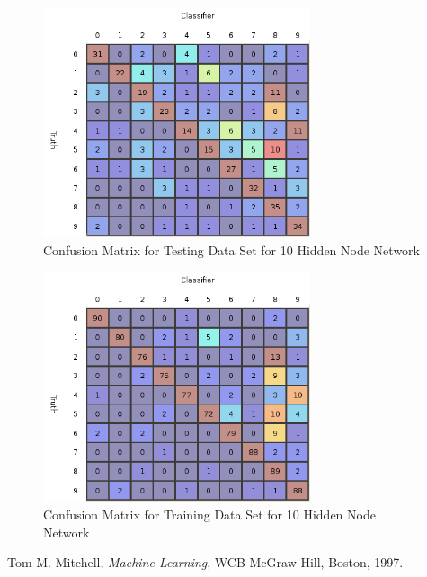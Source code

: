 \documentclass{article}
\begin{document}
\begin{figure}
\centering
\includegraphics[width=0.7\textwidth]{data/final/10_test_confusion.png}
\caption{Confusion Matrix for Testing Data Set for 10 Hidden Node Network}
\label{testconfusion10}
\end{figure}

\begin{figure}
\centering
\includegraphics[width=0.7\textwidth]{data/final/10_train_confusion.png}
\caption{Confusion Matrix for Training Data Set for 10 Hidden Node Network}
\label{trainconfusion10}
\end{figure}

\begin{thebibliography}{9}

  Tom M. Mitchell,
  \emph{Machine Learning},
  WCB McGraw-Hill, Boston,
  1997.

\end{thebibliography}
\end{document}
